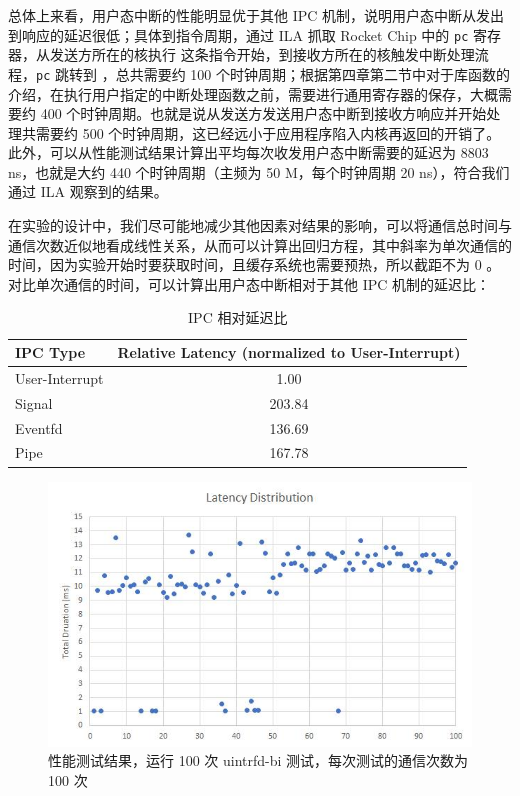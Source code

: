 总体上来看，用户态中断的性能明显优于其他 IPC 机制，说明用户态中断从发出到响应的延迟很低；具体到指令周期，通过 ILA 抓取 Rocket Chip 中的 \texttt{pc} 寄存器，从发送方所在的核执行 \Iuipisend 这条指令开始，到接收方所在的核触发中断处理流程，\texttt{pc} 跳转到 \Rutvec ，总共需要约 100 个时钟周期；根据第四章第二节中对于库函数的介绍，在执行用户指定的中断处理函数之前，需要进行通用寄存器的保存，大概需要约 400 个时钟周期。也就是说从发送方发送用户态中断到接收方响应并开始处理共需要约 500 个时钟周期，这已经远小于应用程序陷入内核再返回的开销了。此外，可以从性能测试结果计算出平均每次收发用户态中断需要的延迟为 8803 ns，也就是大约 440 个时钟周期（主频为 50 M，每个时钟周期 20 ns），符合我们通过 ILA 观察到的结果。

在实验的设计中，我们尽可能地减少其他因素对结果的影响，可以将通信总时间与通信次数近似地看成线性关系，从而可以计算出回归方程，其中斜率为单次通信的时间，因为实验开始时要获取时间，且缓存系统也需要预热，所以截距不为 0 。对比单次通信的时间，可以计算出用户态中断相对于其他 IPC 机制的延迟比：

\begin{table}
    \centering
    \begin{threeparttable}[c]
        \begin{tabular}{lc}
            \toprule
            IPC Type & Relative Latency (normalized to User-Interrupt) \\
            \midrule
            User-Interrupt & 1.00 \\
            Signal &  203.84 \\
            Eventfd & 136.69 \\
            Pipe & 167.78 \\
            \bottomrule
        \end{tabular}
        \caption{IPC 相对延迟比}
    \end{threeparttable}
    \label{tab:latency}
\end{table}

\begin{figure}
    \centering
    \includegraphics[width=0.8\linewidth]{figures/bench3.jpg}
    \caption{性能测试结果，运行 100 次 uintrfd-bi 测试，每次测试的通信次数为 100 次}
    \label{fig:deviation}
\end{figure}


